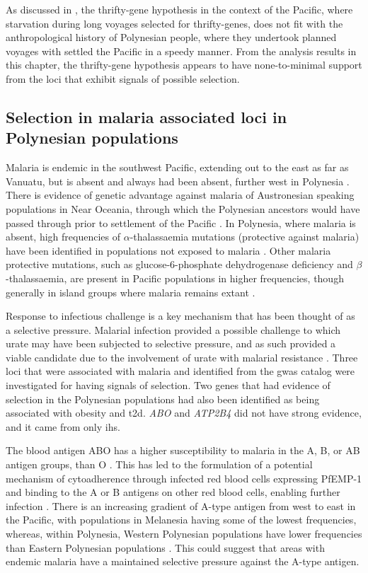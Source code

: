 \documentclass[]{report}
\begin{document}
As discussed in \citet{Gosling2014}, the thrifty-gene hypothesis in the
context of the Pacific, where starvation during long voyages selected
for thrifty-genes, does not fit with the anthropological history of
Polynesian people, where they undertook planned voyages with settled the
Pacific in a speedy manner. From the analysis results in this chapter,
the thrifty-gene hypothesis appears to have none-to-minimal support from
the loci that exhibit signals of possible selection.

\subsection{Selection in malaria associated loci in Polynesian
populations}\label{selection-in-malaria-associated-loci-in-polynesian-populations}

Malaria is endemic in the southwest Pacific, extending out to the east
as far as Vanuatu, but is absent and always had been absent, further
west in Polynesia \citep{Clark1993}. There is evidence of genetic
advantage against malaria of Austronesian speaking populations in Near
Oceania, through which the Polynesian ancestors would have passed
through prior to settlement of the Pacific \citep{Clark1993}. In
Polynesia, where malaria is absent, high frequencies of
\(\alpha\)-thalassaemia mutations (protective against malaria) have been
identified in populations not exposed to malaria \citep{Hill1985}. Other
malaria protective mutations, such as glucose-6-phosphate dehydrogenase
deficiency and \(\beta\)-thalassaemia, are present in Pacific
populations in higher frequencies, though generally in island groups
where malaria remains extant \citep{Cappellini2008, Flint1986}.

Response to infectious challenge is a key mechanism that has been
thought of as a selective pressure. Malarial infection provided a
possible challenge to which urate may have been subjected to selective
pressure, and as such provided a viable candidate due to the involvement
of urate with malarial resistance \citep{GallegoDelgado2014}. Three loci
that were associated with malaria and identified from the \gls{gwas}
catalog were investigated for having signals of selection. Two genes
that had evidence of selection in the Polynesian populations had also
been identified as being associated with obesity and \gls{t2d}.
\emph{ABO} and \emph{ATP2B4} did not have strong evidence, and it came
from only \gls{ihs}.

The blood antigen ABO has a higher susceptibility to malaria in the A,
B, or AB antigen groups, than O \citep{Zerihun2011}. This has led to the
formulation of a potential mechanism of cytoadherence through infected
red blood cells expressing PfEMP-1 and binding to the A or B antigens on
other red blood cells, enabling further infection \citep{Cserti2015}.
There is an increasing gradient of A-type antigen from west to east in
the Pacific, with populations in Melanesia having some of the lowest
frequencies, whereas, within Polynesia, Western Polynesian populations
have lower frequencies than Eastern Polynesian populations
\citep{Simmons1962}. This could suggest that areas with endemic malaria
have a maintained selective pressure against the A-type antigen.
\end{document}
